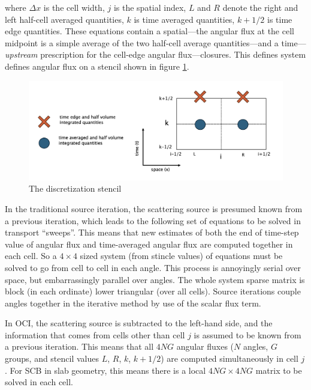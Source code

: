 where $\Delta x$ is the cell width, $j$ is the spatial index, $L$ and $R$ denote the right and left half-cell averaged quantities, $k$ is time averaged quantities, $k+1/2$ is time edge quantities.
These equations contain a spatial---the angular flux at the cell midpoint is a simple average of the two half-cell average quantities---and a time---\textit{upstream} prescription for the cell-edge angular flux---closures.
This defines system defines angular flux on a stencil shown in figure \ref{fig:stencil}.

\begin{figure}[!htb]
    \centering
    \includegraphics[width=\textwidth]{figures/stencil.png}
    \caption{The discretization stencil}
    \label{fig:stencil}
\end{figure}


In the traditional source iteration, the scattering source is presumed known from a previous iteration, which leads to the following set of equations to be solved in transport ``sweeps''.
This means that new estimates of both the end of time-step value of angular flux and time-averaged angular flux are computed together in each cell. 
So a $4\times4$ sized system (from stincle values) of equations must be solved to go from cell to cell in each angle.
This process is annoyingly serial over space, but embarrassingly parallel over angles.
The whole system sparse matrix is block (in each ordinate) lower triangular (over all cells).
Source iterations couple angles together in the iterative method by use of the scalar flux term.

In OCI, the scattering source is subtracted to the left-hand side, and the information that comes from cells other than cell $j$ is assumed to be known from a previous iteration.
This means that all $4NG$ angular fluxes ($N$ angles, $G$ groups, and stencil values $L$, $R$, $k$, $k+1/2$) are computed simultaneously in cell $j$.
For SCB in slab geometry, this means there is a local $4NG \times 4NG$ matrix to be solved in each cell.


